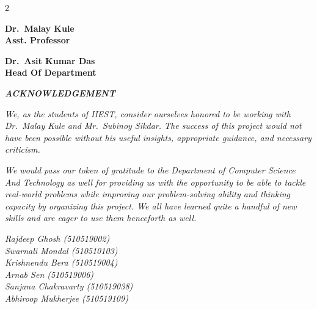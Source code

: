 \documentclass[a4paper]{article}
\begin{document}
\begin{titlepage}
    \vspace{5cm}
    \begin{multicols}{2}
        \begin{center}
            \textbf{Dr.\ Malay Kule\\Asst. Professor}\hspace{5cm}
        \end{center}
        \begin{center}
            \textbf{Dr.\ Asit Kumar Das\\Head Of Department}
        \end{center}
        \vspace{0.5cm}
    \end{multicols}
    \vfill
\end{titlepage}

\pagebreak
\newpage

\begin{titlepage}
    \begin{center}
        {\Large{\bf{\textit{ACKNOWLEDGEMENT}}\\[2cm]}}
    \end{center}


    \textit{\indent We, as the students of IIEST, consider ourselves honored to be working with Dr.\ Malay Kule and Mr.\ Subinoy Sikdar. The success of this project would not have been possible without his useful insights, appropriate guidance, and necessary criticism.}
            
    \textit{\indent We would pass our token of gratitude to the Department of Computer Science And Technology as well for providing us with the opportunity to be able to tackle real-world problems while improving our problem-solving ability and thinking capacity by organizing this project. We all have learned quite a handful of new skills and are eager to use them henceforth as well.}

    \begin{flushleft}
        \textit{Rajdeep Ghosh (510519002)\\
            Swarnali Mondal (510510103)\\
            Krishnendu Bera (510519004)\\
            Arnab Sen (510519006)\\
            Sanjana Chakravarty (510519038)\\
            Abhiroop Mukherjee (510519109)
        }
    \end{flushleft}
\end{titlepage}
\end{document}
